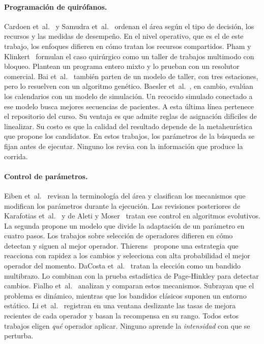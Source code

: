 \documentclass[10pt,a4paper]{article}
\begin{document}
\paragraph{Programación de quirófanos.}
Cardoen et~al.~\cite{cardoen2010} y Samudra et~al.~\cite{samudra2016} ordenan el área según el
tipo de decisión, los recursos y las medidas de desempeño. En el nivel operativo, que es el de
este trabajo, los enfoques difieren en cómo tratan los recursos compartidos. Pham y
Klinkert~\cite{pham2008} formulan el caso quirúrgico como un taller de trabajos multimodo con
bloqueo. Plantean un programa entero mixto y lo prueban con un resolutor comercial. Bai
et~al.~\cite{bai2022} también parten de un modelo de taller, con tres estaciones, pero lo
resuelven con un algoritmo genético. Baesler et~al.~\cite{baesler2015}, en cambio, evalúan los
calendarios con un modelo de simulación. Un recocido simulado conectado a ese modelo busca
mejores secuencias de pacientes. A esta última línea pertenece el repositorio del curso. Su ventaja es que admite reglas de
asignación difíciles de linealizar. Su costo es que la calidad del resultado depende de la
metaheurística que propone los candidatos. En estos trabajos, los parámetros de la búsqueda se
fijan antes de ejecutar. Ninguno los revisa con la información que produce la corrida.

\paragraph{Control de parámetros.}
Eiben et~al.~\cite{eiben1999} revisan la terminología del área y clasifican los mecanismos que
modifican los parámetros durante la ejecución. Las revisiones posteriores de Karafotias
et~al.~\cite{karafotias2015} y de Aleti y Moser~\cite{aleti2016} tratan ese control en
algoritmos evolutivos. La segunda propone un modelo que divide la adaptación de un parámetro en
cuatro pasos. Los trabajos sobre selección de operadores difieren en cómo detectan y siguen al
mejor operador. Thierens~\cite{thierens2005} propone una estrategia que reacciona con rapidez a
los cambios y selecciona con alta probabilidad el mejor operador del momento. DaCosta
et~al.~\cite{dacosta2008} tratan la elección como un bandido multibrazo. Lo combinan con la
prueba estadística de Page-Hinkley para detectar cambios. Fialho et~al.~\cite{fialho2010}
analizan y comparan estos mecanismos. Subrayan que el problema es dinámico, mientras que los
bandidos clásicos suponen un entorno estático. Li et~al.~\cite{li2014} registran en una ventana
deslizante las tasas de mejora recientes de cada operador y basan la recompensa en su rango.
Todos estos trabajos eligen \emph{qué} operador aplicar. Ninguno aprende la \emph{intensidad}
con que se perturba.
\end{document}
